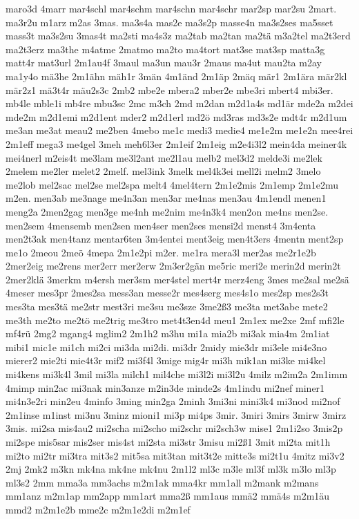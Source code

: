 {maro3d
4marr
mar4schl
mar4schm
mar4schn
mar4schr
mar2sp
mar2su
2mart.
ma3r2u
m1arz
m2as
3mas.
ma3s4a
mas2e
ma3s2p
masse4n
ma3s2ses
ma5sset
mass3t
ma3s2su
3mas4t
ma2sti
ma4s3z
ma2tab
ma2tan
ma2tä
m3a2tel
ma2t3erd
ma2t3erz
ma3the
m4atme
2matmo
ma2to
ma4tort
mat3se
mat3sp
matta3g
matt4r
mat3url
2m1au4f
3maul
ma3un
mau3r
2maus
ma4ut
mau2ta
m2ay
ma1y4o
mä3he
2m1ähn
mäh1r
3män
4m1änd
2m1äp
2mäq
mär1
2m1ära
mär2kl
mär2z1
mä3t4r
mäu2s3c
2mb2
mbe2e
mbera2
mber2e
mbe3ri
mbert4
mbi3er.
mb4le
mble1i
mb4re
mbu3sc
2mc
m3ch
2md
m2dan
m2d1a4s
md1är
mde2a
m2dei
mde2m
m2d1emi
m2d1ent
mder2
m2d1erl
md2ö
md3ras
md3s2e
mdt4r
m2d1um
me3an
me3at
meau2
me2ben
4mebo
me1c
medi3
medie4
me1e2m
me1e2n
mee4rei
2m1eff
mega3
me4gel
3meh
meh6l3er
2m1eif
2m1eig
m2e4i3l2
mein4da
meiner4k
mei4nerl
m2eis4t
me3lam
me3l2ant
me2l1au
melb2
mel3d2
melde3i
me2lek
2melem
me2ler
melet2
2melf.
mel3ink
3melk
mel4k3ei
mell2i
melm2
3melo
me2lob
mel2sac
mel2se
mel2spa
melt4
4mel4tern
2m1e2mis
2m1emp
2m1e2mu
m2en.
men3ab
me3nage
me4n3an
men3ar
me4nas
men3au
4m1endl
menen1
meng2a
2men2gag
men3ge
me4nh
me2nim
me4n3k4
men2on
me4ns
men2se.
men2sem
4mensemb
men2sen
men4ser
men2ses
mensi2d
menst4
3m4enta
men2t3ak
men4tanz
mentar6ten
3m4entei
ment3eig
men4t3ers
4mentn
ment2sp
me1o
2meou
2meö
4mepa
2m1e2pi
m2er.
me1ra
mera3l
mer2as
me2r1e2b
2mer2eig
me2rens
mer2err
mer2erw
2m3er2gän
me5ric
meri2e
merin2d
merin2t
2mer2klä
3merkm
m4ersh
mer3sm
mer4stel
mert4r
merz4eng
3mes
me2sal
me2sä
4meser
mes3pr
2mes2sa
mess3an
messe2r
mes4serg
mes4s1o
mes2sp
mes2s3t
mes3ta
mes3tä
me2str
mest3ri
me3su
me3sze
3me2ß3
me3ta
met3abe
mete2
me3th
me2to
me2tö
me2trig
me3tro
met4t3en4d
meu1
2m1ex
me2xe
2mf
mfi2le
mf4rü
2mg2
mgang4
mglim2
2m1h2
m3hu
mi1a
mia2b
mi3ak
mia4m
2m1iat
mibi1
mic1e
mi1ch
mi2ci
mi3da
mi2di.
mi3dr
2midy
mie3dr
mi3ele
mi4e3no
mierer2
mie2ti
mie4t3r
mif2
mi3f4l
3mige
mig4r
mi3h
mik1an
mi3ke
mi4kel
mi4kens
mi3k4l
3mil
mi3la
milch1
mil4che
mi3l2i
mi3l2u
4milz
m2im2a
2m1imm
4mimp
min2ac
mi3nak
min3anze
m2in3de
minde2s
4m1indu
mi2nef
miner1
mi4n3e2ri
min2eu
4minfo
3ming
min2ga
2minh
3mi3ni
mini3k4
mi3nod
mi2nof
2m1inse
m1inst
mi3nu
3minz
mioni1
mi3p
mi4ps
3mir.
3miri
3mirs
3mirw
3mirz
3mis.
mi2sa
mis4au2
mi2scha
mi2scho
mi2schr
mi2sch3w
mise1
2m1i2so
3mis2p
mi2spe
mis5sar
mis2ser
mis4st
mi2sta
mi3str
3misu
mi2ß1
3mit
mi2ta
mit1h
mi2to
mi2tr
mi3tra
mit3s2
mit5sa
mit3tan
mit3t2e
mitte3s
mi2t1u
4mitz
mi3v2
2mj
2mk2
m3kn
mk4na
mk4ne
mk4nu
2m1l2
ml3c
m3le
ml3f
ml3k
m3lo
ml3p
ml3s2
2mm
mma3a
mm3achs
m2m1ak
mma4kr
mm1all
m2mank
m2mans
mm1anz
m2m1ap
mm2app
mm1art
mma2ß
mm1aus
mmä2
mmä4s
m2m1äu
mmd2
m2m1e2b
mme2c
m2m1e2di
m2m1ef
}
